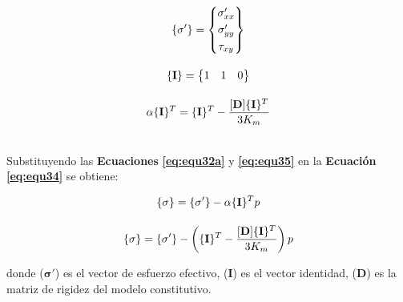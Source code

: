 \begin{ceqn} 
\begin{subequations} \label{eq:equ35} 
\begin{gather}
\normalsize{
       \{\mathbf{\sigma'}\} = \begin{Bmatrix} 
       \sigma'_{xx}\\[0.3em]
       \sigma'_{yy}\\[0.3em]
       \tau_{xy}
       \end{Bmatrix}} \label{eq:equ35a} \\[10pt]
\normalsize{ \{\mathbf{I}\} = \begin{Bmatrix}
       1 & 1 & 0
       \end{Bmatrix}} \label{eq:equ35b} \\[10pt]
\normalsize{ \alpha\{\mathbf{I}\}^T = \{\mathbf{I}\}^T - \frac{[\mathbf{D}]\{\mathbf{I}\}^T}{3K_m}} \label{eq:equ35c}
\end{gather}  
\end{subequations} 
\end{ceqn}
\\
Substituyendo las \textbf{Ecuaciones} \textbf{\ref{eq:equ32a}} y \textbf{\ref{eq:equ35}} en la \textbf{Ecuación} \textbf{\ref{eq:equ34}} se obtiene:

\begin{ceqn} 
\begin{subequations} \label{eq:equ36} 
\begin{gather}
\normalsize{\{\mathbf{\sigma}\} = \{\mathbf{\sigma'}\} - \alpha\{\mathbf{I}\}^T p} \label{eq:equ36a} \\[10pt]
\normalsize{\{\mathbf{\sigma}\} = \{\mathbf{\sigma'}\} - \left(\{\mathbf{I}\}^T - \frac{[\mathbf{D}]\{\mathbf{I}\}^T}{3K_m}\right)p} \label{eq:equ36b} 
\end{gather}  
\end{subequations} 
\end{ceqn}
donde ($\mathbf{\sigma'}$) es el vector de esfuerzo efectivo, ($\mathbf{I}$) es el vector identidad, ($\mathbf{D}$) es la matriz de rigidez del modelo constitutivo.\bigskip\bigskip


